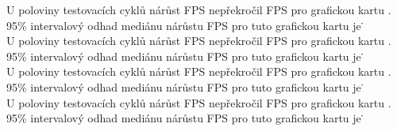 \begin{enumerate}[label=\alph*)]
\begin{minipage}{0.94\textwidth}
        \vspace{1em}
        \label{tab:interval-estimation-all}
        \vspace{0.5em}
        \renewcommand{\arraystretch}{1.3}
        \vspace{1em}

        U poloviny testovacích cyklů nárůst FPS nepřekročil  FPS pro grafickou kartu \nvidiaCardDva.\@
        95\% intervalový odhad mediánu nárůstu FPS pro tuto grafickou kartu je \rtxDvaInterval\.\@ \\

        U poloviny testovacích cyklů nárůst FPS nepřekročil  FPS pro grafickou kartu \nvidiaCardTri.\@
        95\% intervalový odhad mediánu nárůstu FPS pro tuto grafickou kartu je \rtxTriInterval\.\@ \\

        U poloviny testovacích cyklů nárůst FPS nepřekročil  FPS pro grafickou kartu \amdCardSest.\@
        95\% intervalový odhad mediánu nárůstu FPS pro tuto grafickou kartu je \amdSestInterval\.\@ \\

        U poloviny testovacích cyklů nárůst FPS nepřekročil  FPS pro grafickou kartu \amdCardSedm.\@
        95\% intervalový odhad mediánu nárůstu FPS pro tuto grafickou kartu je \amdSedmInterval\.\@ \\


\end{minipage}
\end{enumerate}
